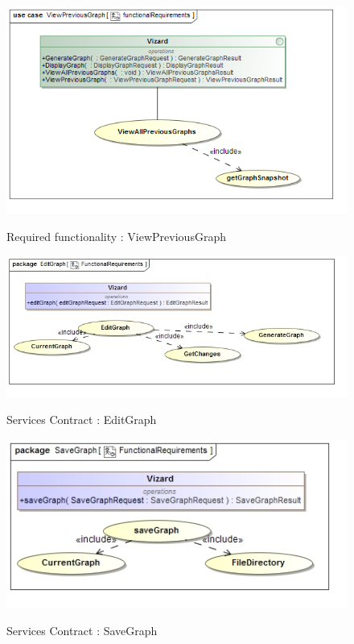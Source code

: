 \documentclass[a4paper,12pt]{article}
\begin{document}
	\begin{figure}[H]
		\includegraphics[width=\textwidth]{Images/uc__ViewPreviousGraph__functionalRequirements.png}  \\
		\caption{Required functionality : ViewPreviousGraph}
	\end{figure}	
	
	\begin{figure}[H]
		\includegraphics[width=\textwidth]{Images/uc__EditGraph}  \\
		\caption{Services Contract : EditGraph}
	\end{figure}
	
	\begin{figure}[H]
		\includegraphics[width=\textwidth]{Images/uc__SaveGraph}  \\
		\caption{Services Contract : SaveGraph}
	\end{figure}
	
\end{document}
